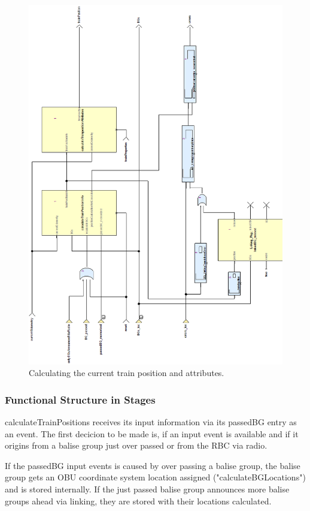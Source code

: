 \begin{figure}
\centering
\includegraphics[scale=0.5]{../images/calculateTrainPosition_decorations.png}
\caption{Calculating the current train position and attributes.}
\end{figure}


\subsubsection{Functional Structure in Stages}
calculateTrainPositions receives its input information via its passedBG entry as an event. The first decicion to be made is, if an input event is available and if it origins from a balise group just over passed or from the RBC via radio. 

If the passedBG input events is caused by over passing a balise group, the balise group gets an OBU coordinate system location assigned ("calculateBGLocations") and is stored internally. If the just passed balise group announces more balise groups ahead via linking, they are stored with their locations calculated. 

